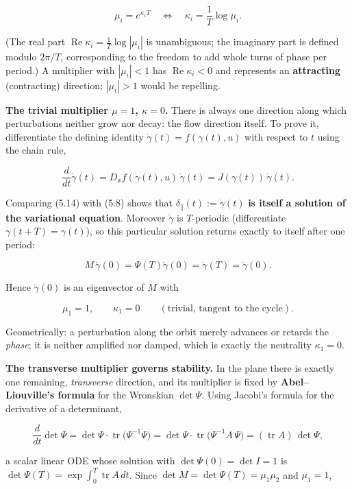 \documentclass[
  11pt,
]{article}
\providecommand{\lt}{<}
\providecommand{\gt}{>}
\begin{document}
\[
\mu_i=e^{\kappa_i T}\quad\Longleftrightarrow\quad \kappa_i=\frac{1}{T}\log\mu_i .
\tag{5.13}
\]

(The real part \(\operatorname{Re}\kappa_i=\tfrac1T\log|\mu_i|\) is
unambiguous; the imaginary part is defined modulo \(2\pi/T\),
corresponding to the freedom to add whole turns of phase per period.) A
multiplier with \(|\mu_i|\lt 1\) has \(\operatorname{Re}\kappa_i\lt 0\)
and represents an \textbf{attracting} (contracting) direction;
\(|\mu_i|\gt 1\) would be repelling.

\textbf{The trivial multiplier \(\mu=1\), \(\kappa=0\).} There is always
one direction along which perturbations neither grow nor decay: the flow
direction itself. To prove it, differentiate the defining identity
\(\dot\gamma(t)=f(\gamma(t),u)\) with respect to \(t\) using the chain
rule,

\[
\frac{d}{dt}\dot\gamma(t)=D_xf(\gamma(t),u)\,\dot\gamma(t)=J(\gamma(t))\,\dot\gamma(t).
\tag{5.14}
\]

Comparing (5.14) with (5.8) shows that
\(\delta_\parallel(t):=\dot\gamma(t)\) \textbf{is itself a solution of
the variational equation}. Moreover \(\dot\gamma\) is \(T\)-periodic
(differentiate \(\gamma(t+T)=\gamma(t)\)), so this particular solution
returns exactly to itself after one period:

\[
M\,\dot\gamma(0)=\Psi(T)\dot\gamma(0)=\dot\gamma(T)=\dot\gamma(0).
\]

Hence \(\dot\gamma(0)\) is an eigenvector of \(M\) with

\[
\mu_1=1,\qquad \kappa_1=0\qquad(\text{trivial, tangent to the cycle}).
\tag{5.15}
\]

Geometrically: a perturbation along the orbit merely advances or retards
the \emph{phase}; it is neither amplified nor damped, which is exactly
the neutrality \(\kappa_1=0\).

\textbf{The transverse multiplier governs stability.} In the plane there
is exactly one remaining, \emph{transverse} direction, and its
multiplier is fixed by \textbf{Abel--Liouville's formula} for the
Wronskian \(\det\Psi\). Using Jacobi's formula for the derivative of a
determinant,

\[
\frac{d}{dt}\det\Psi=\det\Psi\cdot\operatorname{tr}\!\big(\Psi^{-1}\dot\Psi\big)
=\det\Psi\cdot\operatorname{tr}\!\big(\Psi^{-1}A\,\Psi\big)
=(\operatorname{tr}A)\,\det\Psi,
\]

a scalar linear ODE whose solution with \(\det\Psi(0)=\det I=1\) is
\(\det\Psi(T)=\exp\!\int_0^T\operatorname{tr}A\,dt\). Since
\(\det M=\det\Psi(T)=\mu_1\mu_2\) and \(\mu_1=1\),
\end{document}
